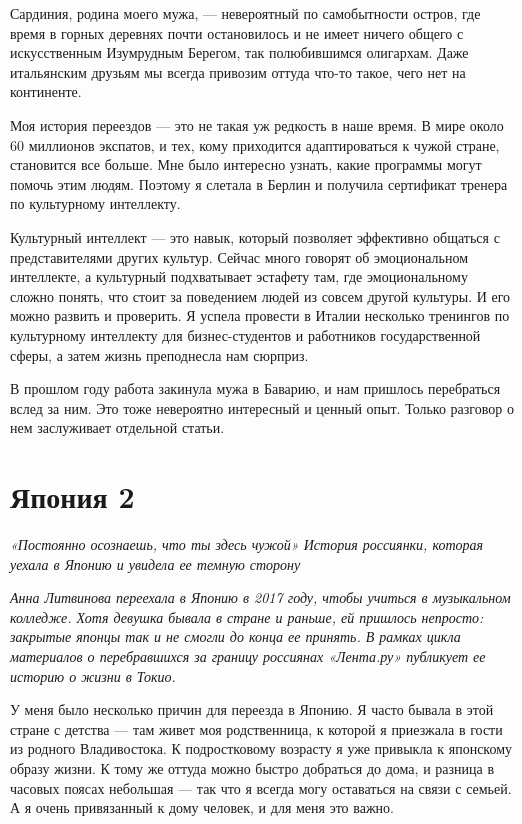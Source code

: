 Сардиния, родина моего мужа, — невероятный по самобытности остров, где время в горных деревнях почти остановилось и не имеет ничего общего с искусственным Изумрудным Берегом, так полюбившимся олигархам. Даже итальянским друзьям мы всегда привозим оттуда что-то такое, чего нет на континенте.

Моя история переездов — это не такая уж редкость в наше время. В мире около 60 миллионов экспатов, и тех, кому приходится адаптироваться к чужой стране, становится все больше. Мне было интересно узнать, какие программы могут помочь этим людям. Поэтому я слетала в Берлин и получила сертификат тренера по культурному интеллекту.

Культурный интеллект — это навык, который позволяет эффективно общаться с представителями других культур. Сейчас много говорят об эмоциональном интеллекте, а культурный подхватывает эстафету там, где эмоциональному сложно понять, что стоит за поведением людей из совсем другой культуры. И его можно развить и проверить. Я успела провести в Италии несколько тренингов по культурному интеллекту для бизнес-студентов и работников государственной сферы, а затем жизнь преподнесла нам сюрприз.

В прошлом году работа закинула мужа в Баварию, и нам пришлось перебраться вслед за ним. Это тоже невероятно интересный и ценный опыт. Только разговор о нем заслуживает отдельной статьи.

\newpage
\section{Япония 2}

\textit{«Постоянно осознаешь, что ты здесь чужой» История россиянки, которая уехала в Японию и увидела ее темную сторону}

\textit{Анна Литвинова переехала в Японию в 2017 году, чтобы учиться в музыкальном колледже. Хотя девушка бывала в стране и раньше, ей пришлось непросто: закрытые японцы так и не смогли до конца ее принять. В рамках цикла материалов о перебравшихся за границу россиянах «Лента.ру» публикует ее историю о жизни в Токио.}

У меня было несколько причин для переезда в Японию. Я часто бывала в этой стране с детства — там живет моя родственница, к которой я приезжала в гости из родного Владивостока. К подростковому возрасту я уже привыкла к японскому образу жизни. К тому же оттуда можно быстро добраться до дома, и разница в часовых поясах небольшая — так что я всегда могу оставаться на связи с семьей. А я очень привязанный к дому человек, и для меня это важно.

